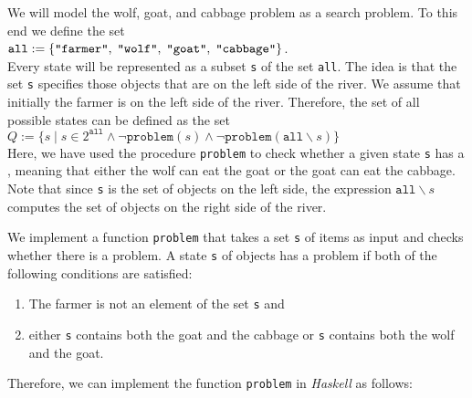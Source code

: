 \noindent
We will model the wolf, goat, and cabbage problem as a search problem.
To this end we define the set
\\[0.2cm]
\hspace*{1.3cm} 
$\texttt{all} := \{ \squote{farmer},\; \squote{wolf},\; \squote{goat},\; \squote{cabbage} \}$.
\\[0.2cm]
Every state will be represented as a subset \texttt{s} of the set \texttt{all}.  The idea is that the set \texttt{s}
specifies those objects that are on the left side of the river.  We assume that initially the farmer
is on the left side of the river. 
Therefore, the set of all possible states can be defined as the set
\\[0.2cm]
\hspace*{1.3cm}
$Q := \bigl\{ s \mid s \in 2^{\mathtt{all}} \wedge \neg \mathtt{problem}(s) \wedge \neg \mathtt{problem}(\mathtt{all} \backslash s) \bigl\}$
\\[0.2cm]
Here, we have used the procedure \texttt{problem} to check whether a given state \texttt{s} has a
, meaning that either the wolf can eat the goat or the goat can eat the cabbage. 
Note that since \texttt{s} is the set of objects on the left side, the expression $\texttt{all} \backslash s$
computes the set of objects on the right side of the river.

We implement a function \texttt{problem} that takes a set \texttt{s} of items as input and checks whether there
is a problem.  A state \texttt{s} of objects has a problem if both of the following conditions are satisfied:
\begin{enumerate}
\item The farmer is not an element of the set \texttt{s} and
\item either \texttt{s} contains both the goat and the cabbage or \texttt{s} contains both the wolf and the goat.
\end{enumerate}
Therefore, we can implement the function \texttt{problem} in \textsl{Haskell} as follows:

